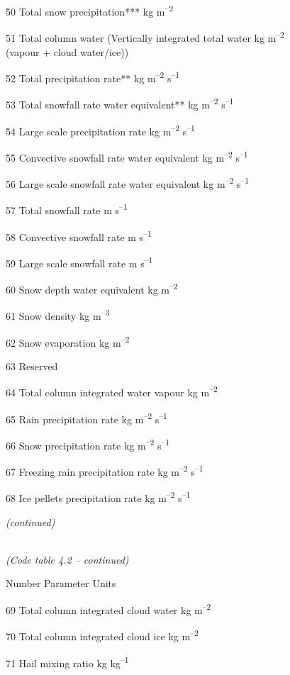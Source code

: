 50 Total snow precipitation*** kg m\textsuperscript{--2}

51 Total column water (Vertically integrated total water kg m\textsuperscript{--2}\\
(vapour + cloud water/ice))

52 Total precipitation rate** kg m\textsuperscript{--2} s\textsuperscript{--1}

53 Total snowfall rate water equivalent** kg m\textsuperscript{--2} s\textsuperscript{--1}

54 Large scale precipitation rate kg m\textsuperscript{--2} s\textsuperscript{--1}

55 Convective snowfall rate water equivalent kg m\textsuperscript{--2} s\textsuperscript{--1}

56 Large scale snowfall rate water equivalent kg m\textsuperscript{--2} s\textsuperscript{--1}

57 Total snowfall rate m s\textsuperscript{--1}

58 Convective snowfall rate m s\textsuperscript{--1}

59 Large scale snowfall rate m s\textsuperscript{--1}

60 Snow depth water equivalent kg m\textsuperscript{--2}

61 Snow density kg m\textsuperscript{--3}

62 Snow evaporation kg m\textsuperscript{--2}

63 Reserved

64 Total column integrated water vapour kg m\textsuperscript{--2}

65 Rain precipitation rate kg m\textsuperscript{--2} s\textsuperscript{--1}

66 Snow precipitation rate kg m\textsuperscript{--2} s\textsuperscript{--1}

67 Freezing rain precipitation rate kg m\textsuperscript{--2} s\textsuperscript{--1}

68 Ice pellets precipitation rate kg m\textsuperscript{--2} s\textsuperscript{--1}

\emph{(continued)}

\emph{\\
(Code table 4.2 -- continued)}

Number Parameter Units

69 Total column integrated cloud water kg m\textsuperscript{--2}

70 Total column integrated cloud ice kg m\textsuperscript{--2}

71 Hail mixing ratio kg kg\textsuperscript{--1}

